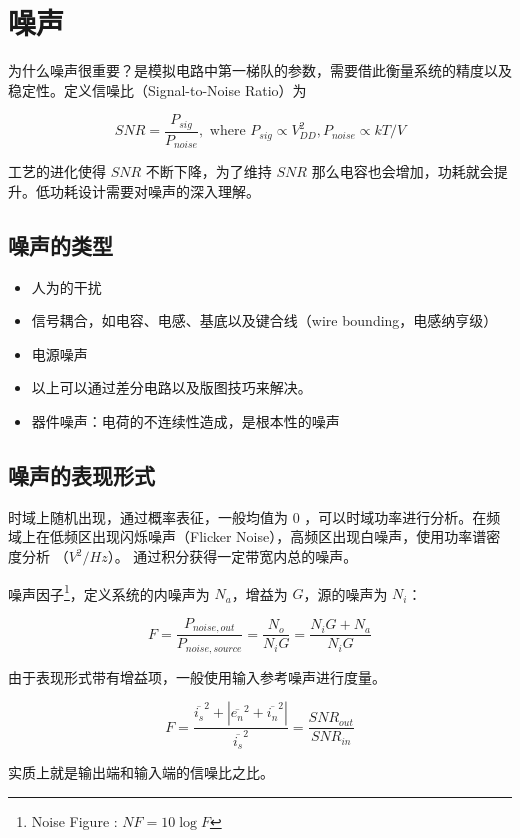 \documentclass[cn,11pt,chinese,black,simple]{../elegantbook}
\begin{document}
\fi 
\def\chapname{03noise}

\chapter{噪声}

为什么噪声很重要？是模拟电路中第一梯队的参数，需要借此衡量系统的精度以及稳定性。定义信噪比（Signal-to-Noise Ratio）为 

\[SNR = \frac{P_{sig}}{P_{noise}}, \text{ where } P_{sig} \propto V_{DD}^2, P_{noise} \propto kT/V\]

工艺的进化使得 \(SNR\) 不断下降，为了维持 \(SNR\) 那么电容也会增加，功耗就会提升。低功耗设计需要对噪声的深入理解。

\section{噪声的类型}

\begin{itemize}
    \item 人为的干扰
    \item 信号耦合，如电容、电感、基底以及键合线（wire bounding，电感纳亨级）
    \item 电源噪声
    \item 以上可以通过差分电路以及版图技巧来解决。
    \item 器件噪声：电荷的不连续性造成，是根本性的噪声
\end{itemize}

\section{噪声的表现形式}

时域上随机出现，通过概率表征，一般均值为 0 ，可以时域功率进行分析。在频域上在低频区出现闪烁噪声（Flicker Noise），高频区出现白噪声，使用功率谱密度分析 （\(V^2/Hz\)）。
通过积分获得一定带宽内总的噪声。

噪声因子\footnote{Noise Figure : \(NF = 10 \log F\)}，定义系统的内噪声为 \(N_a\)，增益为 \(G\)，源的噪声为 \(N_i\)：

\[F = \frac{P_{noise, out}}{P_{noise, source}} = \frac{N_o}{N_i G} = \frac{N_i G + N_a}{N_i G}\]

由于表现形式带有增益项，一般使用输入参考噪声进行度量。

\[F = \frac{\overline{i_s}^2 + |\overline{e_n}^2 + \overline{i_n}^2|}{\overline{i_s}^2} = \frac{SNR_{out}}{SNR_{in}}\]

实质上就是输出端和输入端的信噪比之比。
\end{document}
